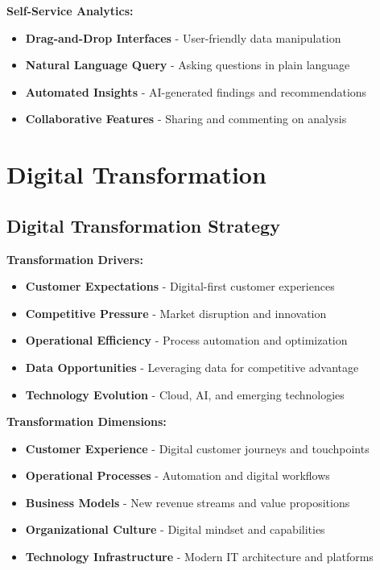 \documentclass[12pt]{article}
\begin{document}
\textbf{Self-Service Analytics:}
\begin{itemize}
    \item \textbf{Drag-and-Drop Interfaces} - User-friendly data manipulation
    \item \textbf{Natural Language Query} - Asking questions in plain language
    \item \textbf{Automated Insights} - AI-generated findings and recommendations
    \item \textbf{Collaborative Features} - Sharing and commenting on analysis
\end{itemize}

\section{Digital Transformation}

\subsection{Digital Transformation Strategy}

\textbf{Transformation Drivers:}
\begin{itemize}
    \item \textbf{Customer Expectations} - Digital-first customer experiences
    \item \textbf{Competitive Pressure} - Market disruption and innovation
    \item \textbf{Operational Efficiency} - Process automation and optimization
    \item \textbf{Data Opportunities} - Leveraging data for competitive advantage
    \item \textbf{Technology Evolution} - Cloud, AI, and emerging technologies
\end{itemize}

\textbf{Transformation Dimensions:}
\begin{itemize}
    \item \textbf{Customer Experience} - Digital customer journeys and touchpoints
    \item \textbf{Operational Processes} - Automation and digital workflows
    \item \textbf{Business Models} - New revenue streams and value propositions
    \item \textbf{Organizational Culture} - Digital mindset and capabilities
    \item \textbf{Technology Infrastructure} - Modern IT architecture and platforms
\end{itemize}
\end{document}

